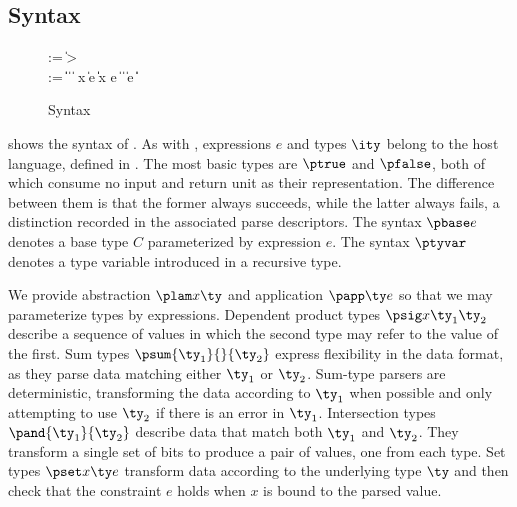 \subsection{\ddc{} Syntax}
\begin{figure}
{\small
\begin{bnf}
   \meta{\gk} \::= \kty \| \ity \-> \gk 
                               \pext{\| \gk \-> \gk} \\
   \meta{\ty} \::= 
    \ptrue\| \pfalse \|  \| 
    \plam{\var}{\ity}{\ty} \|  \nlalt
    \psig x \ty \ty \| \psum \ty e \ty \| \pand \ty \ty \|
    \pset x \ty e \| \pseq \ty {} \nlalt
    \ptyvar       \| \pmu{\ptyvar}{\ty} \| \pcompute e \ity \| \pabsorb \ty \| \pscan{\ty} 
\end{bnf}
}
\caption{\ddc{} Syntax}
\label{fig:ddc-syntax}
\end{figure}
 shows the syntax of \ddc{}. As with
\ipads{}, expressions $e$ and types $\ity$ belong to the host
language, defined in .
The most basic types are $\ptrue$ and $\pfalse$, both of which consume
no input and return unit as their
representation.  The difference between them is that
the former always succeeds, while the latter always fails, a
distinction recorded in the associated parse descriptors.
The syntax $\pbase e$ denotes a base type $C$ parameterized by 
expression $e$. The syntax $\ptyvar$ denotes a type variable
introduced in a recursive type.

We provide abstraction $\plam x {} \ty$ and application
$\papp \ty e$ so that we may parameterize types by expressions.
Dependent product types $\psig x {\ty_1} {\ty_2}$ describe a sequence
of values in which the second type may refer to the value of the first.
Sum types $\psum {\ty_1} {} {\ty_2}$
express flexibility in the data format, as they parse
data matching either $\ty_1$ or $\ty_2$. Sum-type parsers
are deterministic, transforming the data according to $\ty_1$
when possible and only attempting to
use $\ty_2$ if there is an error in $\ty_1$. Intersection types
$\pand {\ty_1} {\ty_2}$ describe data that match both $\ty_1$ and
$\ty_2$. They transform a single set of bits to produce
a pair of values, one from each type. Set types $\pset x \ty e$
transform data according to the underlying type $\ty$ and
then check that the constraint $e$ holds when $x$ is bound to the parsed value.


